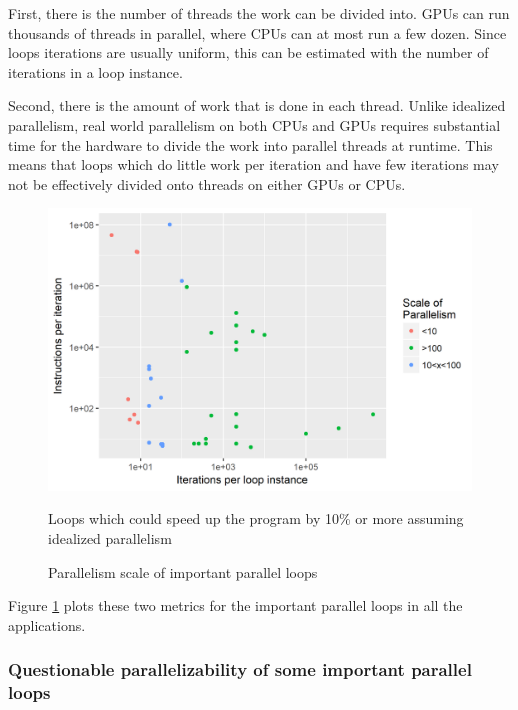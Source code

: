 \documentclass[12pt,twoside]{reedthesis}
\begin{document}
		First, there is the number of threads the work can be divided into. GPUs can run thousands of threads in parallel, where CPUs can at most run a few dozen. Since loops iterations are usually uniform, this can be estimated with the number of iterations in a loop instance. 
		
		Second, there is the amount of work that is done in each thread. Unlike idealized parallelism, real world parallelism on both CPUs and GPUs requires substantial time for the hardware to divide the work into parallel threads at runtime. This means that loops which do little work per iteration and have few iterations may not be effectively divided onto threads on either GPUs or CPUs. 
		
		\begin{figure}
			\caption{Parallelism scale of important parallel loops}
			\label{fig:paralleism-scale}
			
			\begin{minipage}{0.6\textwidth} %
				\includegraphics[scale=0.7]{plots/categorized_conflicts.png}
				{\footnotesize Loops which could speed up the program by 10\% or more assuming idealized parallelism \par}
			\end{minipage}
		\end{figure}
		
		Figure \ref{fig:paralleism-scale} plots these two metrics for the important parallel loops in all the applications. 
		
		\subsubsection{Questionable parallelizability of some important parallel loops}
		
\end{document}
